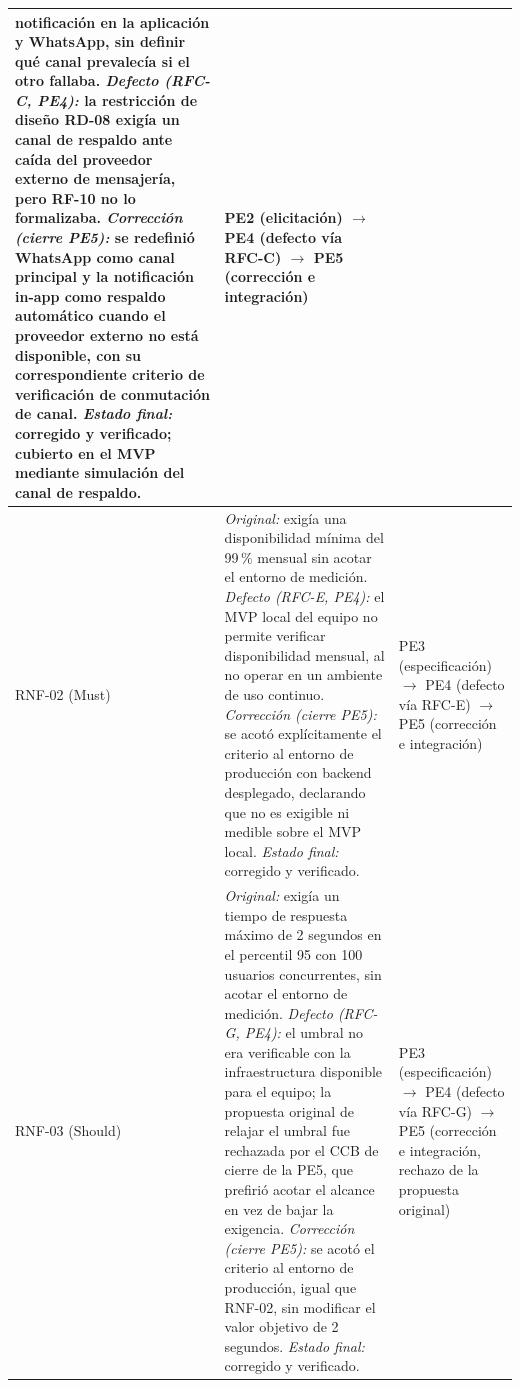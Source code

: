 \documentclass[journal,onecolumn]{IEEEtran}
\begin{document}
\begin{table}[H]
\begin{tabularx}{\textwidth}{
				|>{\raggedright\arraybackslash}p{1.1cm}
				|>{\raggedright\arraybackslash}X
				|>{\raggedright\arraybackslash}p{2.6cm}|}
			notificación en la aplicación y WhatsApp, sin definir qué canal
			prevalecía si el otro fallaba. \emph{Defecto (RFC-C, PE4):} la
			restricción de diseño RD-08 exigía un canal de respaldo ante caída
			del proveedor externo de mensajería, pero RF-10 no lo formalizaba.
			\emph{Corrección (cierre PE5):} se redefinió WhatsApp como canal
			principal y la notificación in-app como respaldo automático cuando
			el proveedor externo no está disponible, con su correspondiente
			criterio de verificación de conmutación de canal. \emph{Estado
				final:} corregido y verificado; cubierto en el MVP mediante
			simulación del canal de respaldo. &
			PE2 (elicitación) $\rightarrow$ PE4 (defecto vía RFC-C) $\rightarrow$
			PE5 (corrección e integración) \\
			\hline
			RNF-02
			(Must) &
			\emph{Original:} exigía una disponibilidad mínima del 99\,\% mensual
			sin acotar el entorno de medición. \emph{Defecto (RFC-E, PE4):} el
			MVP local del equipo no permite verificar disponibilidad mensual, al
			no operar en un ambiente de uso continuo. \emph{Corrección (cierre
				PE5):} se acotó explícitamente el criterio al entorno de producción
			con backend desplegado, declarando que no es exigible ni medible
			sobre el MVP local. \emph{Estado final:} corregido y verificado. &
			PE3 (especificación) $\rightarrow$ PE4 (defecto vía RFC-E)
			$\rightarrow$ PE5 (corrección e integración) \\
			\hline
			RNF-03
			(Should) &
			\emph{Original:} exigía un tiempo de respuesta máximo de 2 segundos
			en el percentil 95 con 100 usuarios concurrentes, sin acotar el
			entorno de medición. \emph{Defecto (RFC-G, PE4):} el umbral no era
			verificable con la infraestructura disponible para el equipo; la
			propuesta original de relajar el umbral fue rechazada por el CCB de
			cierre de la PE5, que prefirió acotar el alcance en vez de bajar la
			exigencia. \emph{Corrección (cierre PE5):} se acotó el criterio al
			entorno de producción, igual que RNF-02, sin modificar el valor
			objetivo de 2 segundos. \emph{Estado final:} corregido y verificado.
			&
			PE3 (especificación) $\rightarrow$ PE4 (defecto vía RFC-G)
			$\rightarrow$ PE5 (corrección e integración, rechazo de la propuesta
			original) \\
			\hline
		\end{tabularx}
	\end{table}
	
\end{document}
